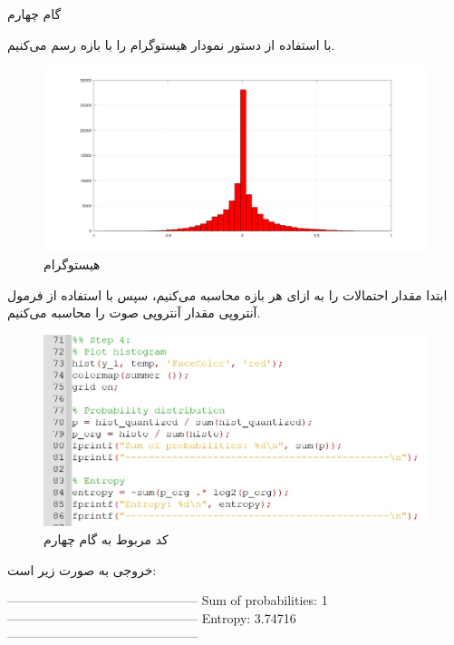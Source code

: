 \Problem
{گام چهارم}
{
با استفاده از دستور  نمودار هیستوگرام را با  بازه رسم می‌کنیم.

\begin{figure}[H]
    \includegraphics[width=15cm]{Images/histogram.png}
    \centering
    \caption{هیستوگرام}
\end{figure}

ابتدا مقدار احتمالات را به ازای هر بازه محاسبه می‌کنیم، سپس با استفاده از فرمول آنتروپی مقدار آنتروپی صوت را محاسبه می‌کنیم.

\begin{figure}[H]
    \includegraphics[width=15cm]{Images/step_4_code.jpg}
    \centering
    \caption{کد مربوط به گام چهارم}
\end{figure}

خروجی به صورت زیر است:

\begin{latin}
\newline
---------------------------------------------
\newline
Sum of probabilities: 1
\newline
---------------------------------------------
\newline
Entropy: 3.74716
\newline
---------------------------------------------
\newline
\end{latin}


}
